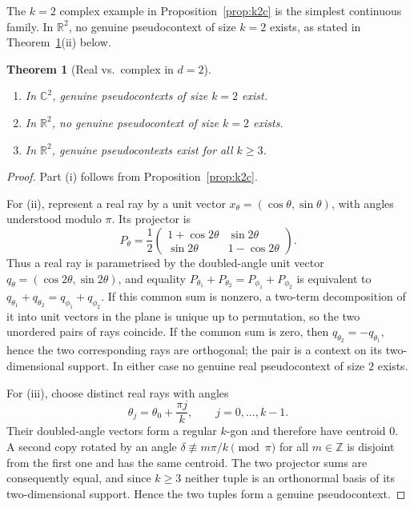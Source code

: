 \documentclass[
  twocolumn,
  aps,
  pra,
  floatfix,
  amsmath,amssymb,
  longbibliography
]{revtex4-2}
\newtheorem{theorem}{Theorem}
\theoremstyle{definition}
\theoremstyle{remark}
\begin{document}
The $k=2$ complex example in Proposition~\ref{prop:k2c} is the simplest
continuous family. In $\mathbb{R}^2$, no genuine pseudocontext of size
$k=2$ exists, as stated in Theorem~\ref{thm:d2_real_complex}(ii) below.

\begin{theorem}[Real vs.\ complex in $d=2$]
\label{thm:d2_real_complex}
$\;$
\begin{enumerate}
\item[(i)] In $\mathbb{C}^2$, genuine pseudocontexts of size $k=2$
exist.
\item[(ii)] In $\mathbb{R}^2$, no genuine pseudocontext of size $k=2$
exists.
\item[(iii)] In $\mathbb{R}^2$, genuine pseudocontexts exist for all
$k\ge 3$.
\end{enumerate}
\end{theorem}

\begin{proof}
Part (i) follows from Proposition~\ref{prop:k2c}.

For (ii), represent a real ray by a unit vector
\(x_\theta=(\cos\theta,\sin\theta)\), with angles understood modulo
\(\pi\).  Its projector is
\[
  P_\theta=\frac12
  \begin{pmatrix}
  1+\cos 2\theta & \sin 2\theta\\
  \sin 2\theta & 1-\cos 2\theta
  \end{pmatrix}.
\]
Thus a real ray is parametrised by the doubled-angle unit vector
\(q_\theta=(\cos2\theta,\sin2\theta)\), and equality
\(P_{\theta_1}+P_{\theta_2}=P_{\phi_1}+P_{\phi_2}\) is equivalent to
\(q_{\theta_1}+q_{\theta_2}=q_{\phi_1}+q_{\phi_2}\).
If this common sum is nonzero, a two-term decomposition of it into
unit vectors in the plane is unique up to permutation, so the two
unordered pairs of rays coincide.  If the common sum is zero, then
\(q_{\theta_2}=-q_{\theta_1}\), hence the two corresponding rays are
orthogonal; the pair is a context on its two-dimensional support.
In either case no genuine real pseudocontext of size \(2\) exists.

For (iii), choose distinct real rays with angles
\[
  \theta_j=\theta_0+\frac{\pi j}{k},\qquad j=0,\ldots,k-1.
\]
Their doubled-angle vectors form a regular \(k\)-gon and therefore
have centroid \(0\).  A second copy rotated by an angle
\(\delta\not\equiv m\pi/k\pmod{\pi}\) for all \(m\in\mathbb Z\)
is disjoint from the first one and has the same centroid.  The two
projector sums are consequently equal, and since \(k\ge3\) neither
tuple is an orthonormal basis of its two-dimensional support.  Hence
the two tuples form a genuine pseudocontext.
\end{proof}
\end{document}
